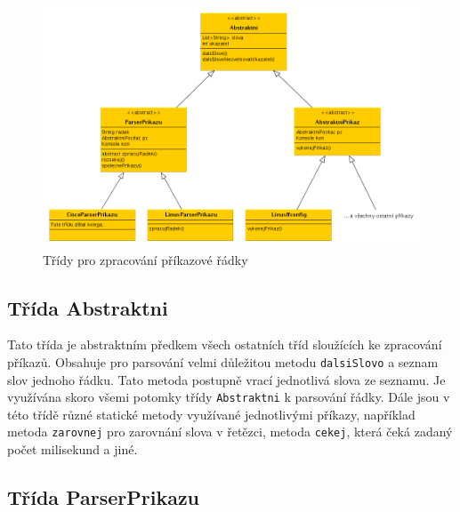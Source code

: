 \begin{figure}[h]
\begin{center}
\includegraphics[width=14cm]{obrazky/prikazy}
\caption{Třídy pro zpracování příkazové řádky}
\label{obr_prikazy}
\end{center}
\end{figure}


\subsection{Třída Abstraktni}

Tato třída je abstraktním předkem všech ostatních tříd sloužících ke zpracování příkazů. Obsahuje pro parsování velmi důležitou metodu \verb|dalsiSlovo| a seznam slov jednoho řádku. Tato metoda postupně vrací jednotlivá slova ze seznamu. Je využívána skoro všemi potomky třídy \verb|Abstraktni| k parsování řádky. Dále jsou v této třídě různé statické metody využívané jednotlivými příkazy, například metoda \verb|zarovnej| pro zarovnání slova v řetězci, metoda \verb|cekej|, která čeká zadaný počet milisekund a jiné.

\subsection{Třída ParserPrikazu}

